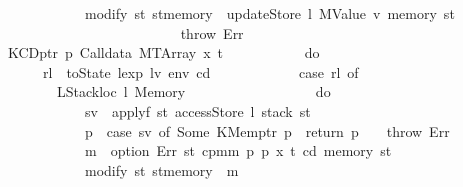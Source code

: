 \begin{isabellebody}
\ \ \ \ \ \ \ \ \ \ \ \ \ \ \ \ \ \ modify\ {\isacharparenleft}{\kern0pt}{\isasymlambda}st{\isachardot}{\kern0pt}\ st{\isasymlparr}memory\ {\isacharcolon}{\kern0pt}{\isacharequal}{\kern0pt}\ updateStore\ l\ {\isacharparenleft}{\kern0pt}MValue\ v{\isacharprime}{\kern0pt}{\isacharparenright}{\kern0pt}\ {\isacharparenleft}{\kern0pt}memory\ st{\isacharparenright}{\kern0pt}{\isasymrparr}{\isacharparenright}{\kern0pt}\isanewline
\ \ \ \ \ \ \ \ \ \ \ \ \ \ \ \ {\isacharbraceright}{\kern0pt}\isanewline
\ \ \ \ \ \ \ \ \ \ \ \ {\isacharbar}{\kern0pt}\ {\isacharunderscore}{\kern0pt}\ {\isasymRightarrow}\ throw\ Err\isanewline
\ \ \ \ \ \ \ \ \ \ {\isacharbraceright}{\kern0pt}\isanewline
\ \ \ \ \ \ {\isacharbar}{\kern0pt}\ {\isacharparenleft}{\kern0pt}KCDptr\ p{\isacharcomma}{\kern0pt}\ Calldata\ {\isacharparenleft}{\kern0pt}MTArray\ x\ t{\isacharparenright}{\kern0pt}{\isacharparenright}{\kern0pt}\ {\isasymRightarrow}\isanewline
\ \ \ \ \ \ \ \ \ \ do\ {\isacharbraceleft}{\kern0pt}\isanewline
\ \ \ \ \ \ \ \ \ \ \ \ rl\ {\isasymleftarrow}\ toState\ {\isacharparenleft}{\kern0pt}lexp\ lv\ env\ cd{\isacharparenright}{\kern0pt}{\isacharsemicolon}{\kern0pt}\isanewline
\ \ \ \ \ \ \ \ \ \ \ \ case\ rl\ of\isanewline
\ \ \ \ \ \ \ \ \ \ \ \ \ \ {\isacharparenleft}{\kern0pt}LStackloc\ l{\isacharcomma}{\kern0pt}\ Memory\ {\isacharunderscore}{\kern0pt}{\isacharparenright}{\kern0pt}\ {\isasymRightarrow}\isanewline
\ \ \ \ \ \ \ \ \ \ \ \ \ \ \ \ do\ {\isacharbraceleft}{\kern0pt}\isanewline
\ \ \ \ \ \ \ \ \ \ \ \ \ \ \ \ \ \ sv\ {\isasymleftarrow}\ applyf\ {\isacharparenleft}{\kern0pt}{\isasymlambda}st{\isachardot}{\kern0pt}\ accessStore\ l\ {\isacharparenleft}{\kern0pt}stack\ st{\isacharparenright}{\kern0pt}{\isacharparenright}{\kern0pt}{\isacharsemicolon}{\kern0pt}\isanewline
\ \ \ \ \ \ \ \ \ \ \ \ \ \ \ \ \ \ p{\isacharprime}{\kern0pt}\ {\isasymleftarrow}\ case\ sv\ of\ Some\ {\isacharparenleft}{\kern0pt}KMemptr\ p{\isacharprime}{\kern0pt}{\isacharparenright}{\kern0pt}\ {\isasymRightarrow}\ return\ p{\isacharprime}{\kern0pt}\ {\isacharbar}{\kern0pt}\ {\isacharunderscore}{\kern0pt}\ {\isasymRightarrow}\ throw\ Err{\isacharsemicolon}{\kern0pt}\isanewline
\ \ \ \ \ \ \ \ \ \ \ \ \ \ \ \ \ \ m\ {\isasymleftarrow}\ option\ Err\ {\isacharparenleft}{\kern0pt}{\isasymlambda}st{\isachardot}{\kern0pt}\ cpm{}m\ p\ p{\isacharprime}{\kern0pt}\ x\ t\ cd\ {\isacharparenleft}{\kern0pt}memory\ st{\isacharparenright}{\kern0pt}{\isacharparenright}{\kern0pt}{\isacharsemicolon}{\kern0pt}\isanewline
\ \ \ \ \ \ \ \ \ \ \ \ \ \ \ \ \ \ modify\ {\isacharparenleft}{\kern0pt}{\isasymlambda}st{\isachardot}{\kern0pt}\ st{\isasymlparr}memory\ {\isacharcolon}{\kern0pt}{\isacharequal}{\kern0pt}\ m{\isasymrparr}{\isacharparenright}{\kern0pt}\isanewline

\end{isabellebody}
